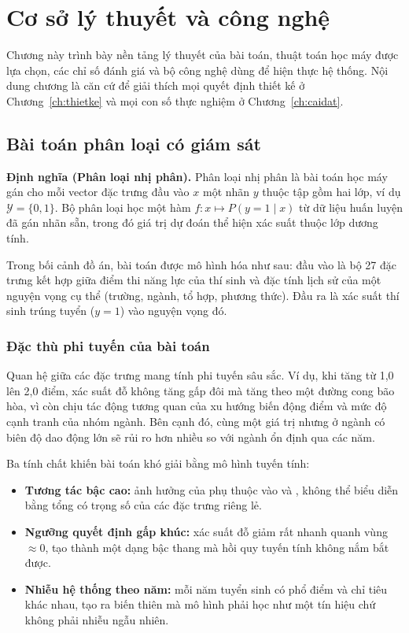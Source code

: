 \chapter{Cơ sở lý thuyết và công nghệ}
\label{ch:coso}

Chương này trình bày nền tảng lý thuyết của bài toán, thuật toán học máy được
lựa chọn, các chỉ số đánh giá và bộ công nghệ dùng để hiện thực hệ thống. Nội
dung chương là căn cứ để giải thích mọi quyết định thiết kế ở Chương~\ref{ch:thietke}
và mọi con số thực nghiệm ở Chương~\ref{ch:caidat}.

\section{Bài toán phân loại có giám sát}

\textbf{Định nghĩa (Phân loại nhị phân).} Phân loại nhị phân  là bài toán học máy gán cho mỗi vector đặc trưng đầu vào $x$
một nhãn $y$ thuộc tập gồm hai lớp, ví dụ $\mathcal{Y} = \{0, 1\}$. Bộ phân
loại học một hàm $f: x \mapsto P(y=1 \mid x)$ từ dữ liệu huấn luyện đã gán
nhãn sẵn, trong đó giá trị dự đoán thể hiện xác suất thuộc lớp dương tính.

Trong bối cảnh đồ án, bài toán được mô hình hóa như sau: đầu vào là bộ 27 đặc
trưng kết hợp giữa điểm thi năng lực của thí sinh và đặc tính lịch sử của một
nguyện vọng cụ thể (trường, ngành, tổ hợp, phương thức). Đầu ra là xác suất
thí sinh trúng tuyển ($y=1$) vào nguyện vọng đó.

\subsection{Đặc thù phi tuyến của bài toán}

Quan hệ giữa các đặc trưng mang tính phi tuyến sâu sắc. Ví dụ, khi
 tăng từ 1,0 lên 2,0 điểm, xác suất đỗ không tăng gấp đôi mà tăng
theo một đường cong bão hòa, vì còn chịu tác động tương quan của xu hướng biến
động điểm và mức độ cạnh tranh của nhóm ngành. Bên cạnh đó, cùng một giá trị
 nhưng ở ngành có biên độ dao động lớn sẽ rủi ro hơn nhiều so với
ngành ổn định qua các năm.

Ba tính chất khiến bài toán khó giải bằng mô hình tuyến tính:

\begin{itemize}[leftmargin=1.6em, itemsep=3pt]
  \item \textbf{Tương tác bậc cao:} ảnh hưởng của  phụ thuộc vào
         và , không thể biểu diễn bằng tổng
        có trọng số của các đặc trưng riêng lẻ.
  \item \textbf{Ngưỡng quyết định gấp khúc:} xác suất đỗ giảm rất nhanh quanh
        vùng  $\approx 0$, tạo thành một dạng bậc thang mà hồi quy
        tuyến tính không nắm bắt được.
  \item \textbf{Nhiễu hệ thống theo năm:} mỗi năm tuyển sinh có phổ điểm và chỉ
        tiêu khác nhau, tạo ra biến thiên mà mô hình phải học như một tín hiệu
        chứ không phải nhiễu ngẫu nhiên.
\end{itemize}

